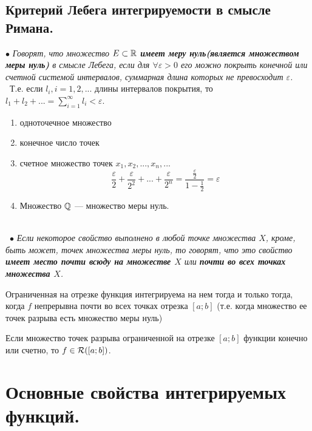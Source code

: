 \section{Критерий Лебега интегрируемости в смысле Римана.}
$\bullet$ \textit{Говорят, что множество $E\subset\mathbb{R}$ \textbf{имеет меру нуль(является множеством меры нуль)} в смысле Лебега, если для $\forall \varepsilon > 0$ его можно покрыть конечной или счетной системой интервалов, суммарная длина которых не превосходит $\varepsilon$.}\\\
Т.е. если $l_i, i = 1, 2, ...$ длины интервалов покрытия, то $l_1 + l_2 + ... = \sum \limits_{i = 1}^{\infty} l_i < \varepsilon$.
\begin{example}
	\begin{enumerate}
		\item одноточечное множество
		\item конечное число точек
		\item счетное множество точек $x_1, x_2, ..., x_n,...$
		$$\frac{\varepsilon}{2} + \frac{\varepsilon}{2^2}+ ... +\frac{\varepsilon}{2^n} = \frac{\frac{\varepsilon}{2}}{1 - \frac{1}{2}} = \varepsilon$$
		\item Множество $\mathbb{Q}$ --- множество меры нуль.
	\end{enumerate}
\end{example}
\\\
$\bullet$
\textit{Если некоторое свойство выполнено в любой точке множества $X$, кроме, быть может, точек множества меры нуль, то говорят, что это свойство \textbf{имеет место почти всюду на множестве $X$}  или \textbf{почти во всех точках множества $X$}.}
\begin{theorem}[Критерий Лебега]
	Ограниченная на отрезке функция интегрируема на нем тогда и только тогда, когда $f$ непрерывна почти во всех точках отрезка $[a;b]$ (т.е. когда множество ее точек разрыва есть множество меры нуль)
\end{theorem}
\begin{corollary}
	Если множество точек разрыва ограниченной на отрезке $[a;b]$ функции конечно или счетно, то $f \in\mathcal{R}([a; b])$.
\end{corollary}
\chapter{Основные свойства интегрируемых функций.}
